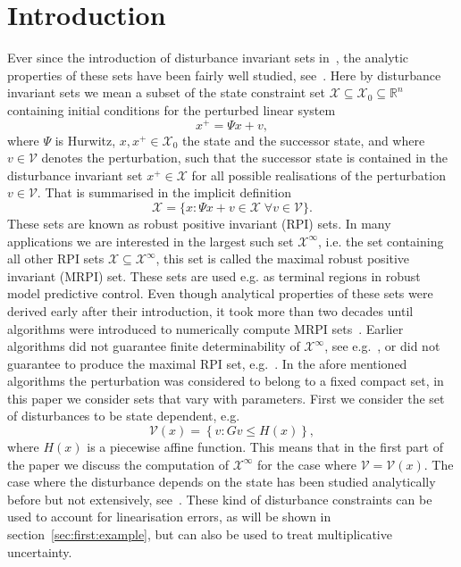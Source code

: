 \documentclass[letterpaper, 10pt, conference]{ieeeconf} %
\begin{document}
\section{Introduction}
Ever since the introduction of disturbance invariant sets in~\cite{Glover:1971}, the analytic
properties of these sets have been fairly well studied, see~\cite{blanchini:2007}. Here by disturbance
invariant sets we mean a subset of the state constraint set $\mathscr X\subseteq\mathcal X_0\subseteq\mathbb R^n$ 
containing initial conditions for the perturbed linear system
\begin{equation}\label{eq:system:equation}
	x^+ = \Psi x + v,
\end{equation}
where $\Psi$ is Hurwitz, $x,x^+\in\mathcal X_0$ the state and the successor state, and where 
$v\in\mathscr V$ denotes the perturbation, such that the successor state is contained in the 
disturbance invariant set $x^+\in\mathscr X$ for all possible realisations of the 
perturbation $v\in\mathscr V$. That is summarised in the implicit definition
\begin{equation}\label{eq:definition:MRPI:set:state:dependent}
	\mathscr X = \{x:\Psi x + v\in\mathscr X\; \forall v\in\mathscr V\}.
\end{equation}
These sets are known as robust positive invariant (RPI) sets. In many applications we are interested in the largest such
set $\mathcal X^\infty$, i.e. the set containing all other RPI sets $\mathscr X\subseteq\mathcal X^\infty$,
this set is called the maximal robust positive invariant (MRPI) set. These sets are used e.g. as terminal regions in 
robust model predictive control. Even though analytical properties
of these sets were derived early after their introduction, it took more than two decades until algorithms
were introduced to numerically compute MRPI sets~\cite{DeSantis:1994,Kolmanovsky:1995,Blanchini:1994}. 
Earlier algorithms
did not guarantee finite determinability of $\mathcal X^\infty$, see e.g.~\cite{Blanchini:1990}, or 
did not guarantee to produce the maximal RPI set, e.g.~\cite{Blanchini:1991}. 
%
In the afore mentioned algorithms the perturbation was considered to belong to a fixed compact set, in this paper
we consider sets that vary with parameters. First we consider the set of disturbances to be state dependent, e.g.
\begin{equation}\label{eq:PWA:distrubance:set}
	\mathcal V(x) = \left\{v: Gv\leq H(x)\right\},
\end{equation}
where $H(x)$ is a piecewise affine function. This means that in the first part of the paper
we discuss the computation of $\mathcal X^\infty$ for the case where $\mathscr V=\mathcal V(x)$.
The case where the disturbance depends on the state has been studied analytically before but not 
extensively, see~\cite{Kuntsevich:1995}. These kind of disturbance constraints can be used to
account for linearisation errors, as will be shown in section~\ref{sec:first:example}, but can also
be used to treat multiplicative uncertainty.
\end{document}
